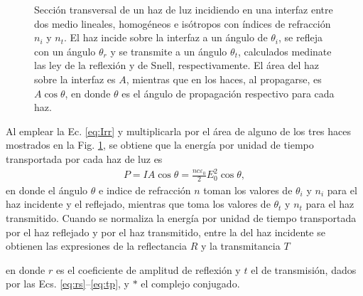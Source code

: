 \begin{figure}[h]
	\caption{Sección transversal de un haz de luz incidiendo en una interfaz entre dos medio lineales, homogéneos e isótropos con índices de refracción $n_i$ y $n_t$. El haz incide sobre la interfaz a un ángulo de $\theta_i$, se refleja con un ángulo $\theta_r$ y se transmite a un ángulo $\theta_t$, calculados medinate las ley de la reflexión y de Snell, respectivamente. El área del haz sobre la interfaz es $A$, mientras que en los haces, al propagarse, es $A\cos\theta$, en donde $\theta$ es el ángulo de propagación respectivo para cada haz.} \label{fig:hazcircular}
	\end{figure}

 Al emplear la Ec. \eqref{eq:Irr} y multiplicarla por el área de alguno de los tres haces mostrados en la Fig. \ref{fig:hazcircular}, se obtiene que la energía por unidad de tiempo transportada por cada haz de luz es
	\begin{align*}
	P = I A \cos\theta = \frac{n c \varepsilon_0}{2} E_{0}^2 \cos\theta,
	\end{align*}
en donde el ángulo $\theta$ e indice de refracción $n$ toman los valores de $\theta_i$ y $n_i$ para el haz incidente y el reflejado, mientras que  toma los valores de $\theta_t$ y  $n_t$ para el haz transmitido. Cuando se normaliza la energía por unidad de tiempo transportada por el haz reflejado y por el haz transmitido, entre la del haz incidente se obtienen las expresiones de la reflectancia $R$ y la transmitancia $T$ \vspace{-.5em} 
	\begin{tcolorbox}[title = Reflectancia y transmitancia]
	\end{tcolorbox}	 \vspace*{-.5em}\noindent	
en donde $r$ es el coeficiente de amplitud de reflexión y $t$ el de transmisión, dados por las Ecs. \eqref{eq:rs}--\eqref{eq:tp}, y $*$ el complejo conjugado.

